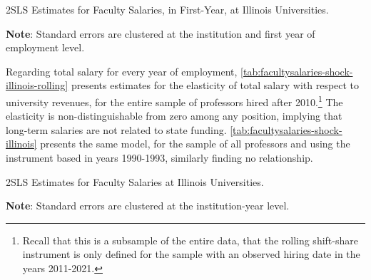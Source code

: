 \begin{table}[h!]
    \singlespacing
    \centering
    \caption{2SLS Estimates for Faculty Salaries, in First-Year, at Illinois Universities.}
    \makebox[\textwidth][c]{}
    \begin{flushleft}
        \footnotesize
        \textbf{Note}: Standard errors are clustered at the institution and first year of employment level. 
    \end{flushleft}
    \label{tab:newhiresalaries-shock-illinois-rolling}
\end{table}

Regarding total salary for every year of employment, \autoref{tab:facultysalaries-shock-illinois-rolling} presents estimates for the elasticity of total salary with respect to university revenues, for the entire sample of professors hired after 2010.\footnote{
    Recall that this is a subsample of the entire data, that the rolling shift-share instrument is only defined for the sample with an observed hiring date in the years 2011-2021.
}
The elasticity is non-distinguishable from zero among any position, implying that long-term salaries are not related to state funding.
\autoref{tab:facultysalaries-shock-illinois} presents the same model, for the sample of all professors and using the instrument based in years 1990-1993, similarly finding no relationship.

\begin{table}[h!]
    \singlespacing
    \centering
    \caption{2SLS Estimates for Faculty Salaries at Illinois Universities.}
    \makebox[\textwidth][c]{}
    \begin{flushleft}
        \footnotesize
        \textbf{Note}: Standard errors are clustered at the institution-year level.
    \end{flushleft}
    \label{tab:facultysalaries-shock-illinois-rolling}
\end{table}

